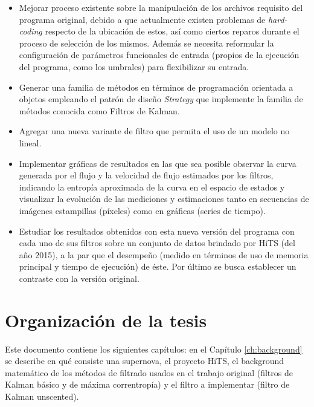 \begin{itemize}


\item Mejorar proceso existente sobre la manipulaci\'on de los archivos requisito del programa original, debido a que actualmente existen problemas de \textit{hard-coding} respecto de la ubicaci\'on de estos, as\'i como ciertos reparos durante el proceso de selecci\'on de los mismos. Adem\'as se necesita reformular la configuraci\'on de par\'ametros funcionales de entrada (propios de la ejecuci\'on del programa, como los umbrales) para flexibilizar su entrada. 
\bigskip

\item Generar una familia de m\'etodos en t\'erminos de programaci\'on orientada a objetos empleando el patr\'on de dise\~no \textit{Strategy} que implemente la familia de m\'etodos conocida como Filtros de Kalman.
\bigskip

\item Agregar una nueva variante de filtro que permita el uso de un modelo no lineal.
\bigskip

\item Implementar gr\'aficas de resultados en las que sea posible observar la curva generada por el flujo y la velocidad de flujo estimados por los filtros, indicando la entrop\'ia aproximada de la curva en el espacio de estados y visualizar la evoluci\'on de las mediciones y estimaciones tanto en secuencias de im\'agenes estampillas (p\'ixeles) como en gr\'aficas (series de tiempo).    
\bigskip

\item Estudiar los resultados obtenidos con esta nueva versi\'on del programa con cada uno de sus filtros sobre un conjunto de datos brindado por HiTS (del a\~no 2015), a la par que el desempe\~no (medido en t\'erminos de uso de memoria principal y tiempo de ejecuci\'on) de \'este. Por \'ultimo se busca establecer un contraste con la versi\'on original.     

\end{itemize}
\section{Organizaci\'on de la tesis}

Este documento contiene los siguientes cap\'itulos: en el Cap\'itulo \ref{ch:background} se describe en qu\'e consiste una supernova, el proyecto HiTS, el background matem\'atico de los m\'etodos de filtrado usados en el trabajo original (filtros de Kalman b\'asico y de m\'axima correntrop\'ia) y el filtro a implementar (filtro de Kalman unscented).%
\bigskip

